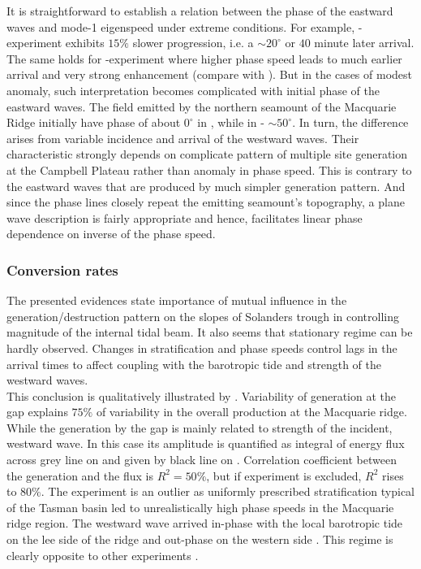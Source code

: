 \documentclass[12pt]{article}
\begin{document}
It is straightforward to establish a relation between the phase of the eastward waves and mode-1 
eigenspeed under extreme conditions. For example, -experiment exhibits $15\%$ slower 
progression, i.e. a $\sim 20^{\circ}$ or $40$ minute later arrival. The same holds for 
-experiment where higher phase speed leads to much earlier arrival and very strong 
enhancement (compare  with ). But in the cases of modest anomaly, such interpretation becomes complicated with initial 
phase of the eastward waves. The field emitted by the northern seamount of the 
Macquarie Ridge initially have phase of about $0^{\circ}$ in , while in  - 
$\sim 50^{\circ}$. In turn, the difference arises from variable incidence and arrival of the 
westward waves. Their characteristic strongly depends on complicate pattern of multiple site 
generation at the Campbell Plateau rather than anomaly in phase speed. This is contrary to the 
eastward waves that are produced by much simpler generation pattern. And since the phase lines 
closely repeat the emitting seamount's topography, a plane wave description is fairly appropriate 
and hence, facilitates linear phase dependence on inverse of the phase speed.\\

\subsubsection{Conversion rates}
The presented evidences state importance of mutual influence in the generation/destruction 
pattern on the slopes of Solanders trough in controlling magnitude of the internal tidal beam. It 
also seems that stationary regime can be hardly observed. Changes in stratification and phase 
speeds control lags in the arrival times to affect coupling with the barotropic tide and strength 
of the westward waves.\\

This conclusion is qualitatively illustrated by . Variability of 
generation at the gap explains $75\%$ of variability in the overall production at the Macquarie 
ridge. While the generation by the gap is mainly related to strength of the incident, westward 
wave. In this case its amplitude is quantified as integral of energy flux across grey line on 
 and given by black line on . Correlation 
coefficient between the generation and the flux is $R^2 = 50\%$, but if  experiment is 
excluded, $R^2$ rises to $80\%$. The  experiment is an outlier as uniformly prescribed 
stratification typical of the Tasman basin led to unrealistically high phase speeds in the 
Macquarie ridge region. The westward wave arrived in-phase with the local barotropic tide on the 
lee side of the ridge and out-phase on the western side . This regime is 
clearly opposite to other experiments .\\
\end{document}
